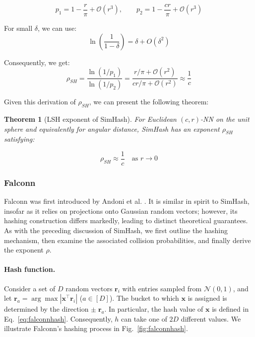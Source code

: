 \documentclass{article}
\newcommand{\bx}{\mathbf{x}}
\newcommand{\br}{\mathbf{r}}
\newcommand{\bigO}{\mathcal{O}}
\newcommand{\mN}{\mathcal{N}}
\newcommand{\argmax}{\arg\max}
\newcommand{\crNN}{$(c, r)$-NN\xspace}
\newtheorem{theorem}{Theorem}[section]
\begin{document}





\[
p_1 = 1 - \frac{r}{\pi} + \bigO(r^3),
\qquad
p_2 = 1 - \frac{cr}{\pi} + \bigO(r^3)
\]

For small $\delta$, we can use:
\[
\ln\!\left(\frac{1}{1-\delta}\right)=\delta+O(\delta^2)
\]

Consequently, we get:
\[
\rho_{SH}
=
\frac{\ln(1/p_1)}{\ln(1/p_2)}
=
\frac{r/\pi + \bigO(r^2)}{cr/\pi + \bigO(r^2)}
\approx
\frac{1}{c}
\]

\medskip

Given this derivation of $\rho_{SH}$, we can present the following theorem:

\begin{theorem}[LSH exponent of SimHash]
    For Euclidean \crNN on the unit sphere and equivalently for angular distance, SimHash has an exponent $\rho_{SH}$ satisfying:

    \[
    \rho_{SH} \approx \frac{1}{c}
    \quad \text{as } r \to 0
    \]
\end{theorem}

\subsubsection{Falconn}
\label{sec:falconn}

Falconn was first introduced by Andoni et al. \cite{andoni2015practical}. It is similar in spirit to SimHash, insofar as it relies on projections onto Gaussian random vectors; however, its hashing construction differs markedly, leading to distinct theoretical guarantees. As with the preceding discussion of SimHash, we first outline the hashing mechanism, then examine the associated collision probabilities, and finally derive the exponent $\rho$.

\paragraph{Hash function.}
Consider a set of $D$ random vectors $\br_i$ with entries sampled from $\mN(0, 1)$, and let $\br_a = \argmax |\bx^\top \br_i|$ ($a \in [D]$). The bucket to which $\bx$ is assigned is determined by the direction $\pm \;  \br_a$. In particular, the hash value of $\bx$ is defined in Eq.~\ref{eq:falconnhash}. Consequently, $h$ can take one of $2D$ different values. We illustrate Falconn's hashing process in Fig.~\ref{fig:falconnhash}. 
\end{document}
